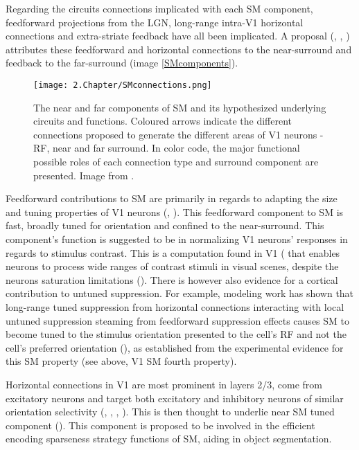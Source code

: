 Regarding the circuits connections implicated with each SM component, feedforward projections from the LGN, long-range intra-V1 horizontal connections and extra-striate feedback have all been implicated. A proposal (\cite{Angelucci2002}, \cite{Angelucci2006}, \cite{Nurminem2014}) attributes these feedforward and horizontal connections to the near-surround and feedback to the far-surround (image \ref{SMcomponents}).

\begin{figure}[H]
\center
\texttt{[image: 2.Chapter/SMconnections.png]}
\caption{The near and far components of SM and its hypothesized underlying circuits and functions. Coloured arrows indicate the different connections proposed to generate the different areas of V1 neurons - RF, near and far surround. In color code, the major functional possible roles of each connection type and surround component are presented.
\newline \newline \tiny{Image from \cite{Shushruth2013}.}}
\label{SMconnections}
\end{figure}

Feedforward contributions to SM are primarily in regards to adapting the size and tuning properties of V1 neurons (\cite{Hubel1962}, \cite{Angelucci2006}). This feedforward component to SM is fast, broadly tuned for orientation and confined to the near-surround. This component's function is suggested to be in normalizing V1 neurons' responses in regards to stimulus contrast. This is a computation found in V1 (\cite{Heeger1992} that enables neurons to process wide ranges of contrast stimuli in visual scenes, despite the neurons saturation limitations (\cite{Carandini2012}). There is however also evidence for a cortical contribution to untuned suppression. For example, modeling work has shown that long-range tuned suppression from horizontal connections interacting with local untuned suppression steaming from feedforward suppression effects causes SM to become tuned to the stimulus orientation presented to the cell's RF and not the cell's preferred orientation (\cite{Shushruth2012}), as established from the experimental evidence for this SM property (see above, V1 SM fourth property).

Horizontal connections in V1 are most prominent in layers 2/3, come from excitatory neurons and target both excitatory and inhibitory neurons of similar orientation selectivity (\cite{Bosking1997}, \cite{Malach1993}, \cite{Schmidt1997}, \cite{Sincich2001}). This is then thought to underlie near SM tuned component (\cite{Gilbert1996}). This component is proposed to be involved in the efficient encoding sparseness strategy functions of SM, aiding in object segmentation.

